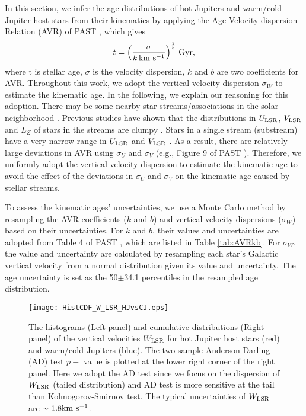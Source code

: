 \documentclass[twocolumn]{pnas-new}
\begin{document}
In this section, we infer the age distributions of hot Jupiters and warm/cold Jupiter host stars from their kinematics by applying the Age-Velocity dispersion Relation (AVR) of PAST \uppercase\expandafter{}, which gives
\begin{equation}
t = \left(\frac{\sigma}{k\rm \, km \ s^{-1}}\right)^{\frac{1}{b}}\, \rm Gyr,
\label{kineage}
\end{equation}
where t is stellar age, $\sigma$ is the velocity dispersion, $k$ and $b$ are two coefficients for AVR.
Throughout this work, we adopt the vertical velocity dispersion $\sigma_W$ to estimate the kinematic age. In the following, we explain our reasoning for this adoption. There may be some nearby star streams/associations in the solar neighborhood \citep[e.g.,][]{2016AstL...42...90B,2017A&A...608A..73K}.
Previous studies have shown that the distributions in $U_{\rm LSR}$, $V_{\rm LSR}$ and $L_Z$ of stars in the streams are clumpy \citep{2005A&A...430..165F,2012MNRAS.426L...1A,2017A&A...608A..73K,2018A&A...619A..72R}. Stars in a single stream (substream) have a very narrow range in $U_{\rm LSR}$ and $V_{\rm LSR}$ \citep[e.g.,][]{2019A&A...631A..47K}. As a result, there are relatively large deviations in AVR using $\sigma_U$ and $\sigma_V$ (e.g., Figure 9 of PAST \uppercase\expandafter{}).
Therefore, we uniformly adopt the vertical velocity dispersion to estimate the kinematic age to avoid the effect of the deviations in $\sigma_U$ and $\sigma_V$ on the kinematic age caused by stellar streams.

To assess the kinematic ages' uncertainties, we use a Monte Carlo method by resampling the AVR coefficients ($k$ and $b$) and vertical velocity dispersions ($\sigma_W$) based on their uncertainties.
For $k$ and $b$, their values and uncertainties are adopted from Table 4 of PAST \uppercase\expandafter{} \citep{2021ApJ...909..115C}, which are listed in Table \ref{tab:AVRkb}.
For $\sigma_W$, the value and uncertainty are calculated by resampling each star's Galactic vertical velocity from a normal distribution given its value and uncertainty.
The age uncertainty is set as the 50$\pm$34.1 percentiles in the resampled age distribution.

\begin{figure}[!t]
\centering
\texttt{[image: HistCDF\_W\_LSR\_HJvsCJ.eps]}
\caption{The histograms (Left panel) and cumulative distributions (Right panel) of the vertical velocities $W_{\rm LSR}$ for hot Jupiter host stars (red) and warm/cold Jupiters (blue).
The two-sample Anderson-Darling (AD)  test $p-$ value is plotted at the lower right corner of the right panel.
Here we adopt the AD test since we focus on the dispersion of $W_{\rm LSR}$ (tailed distribution) and AD test is more sensitive at the tail than Kolmogorov-Smirnov test.
{The typical uncertainties of $W_{\rm LSR}$ are $\sim 1.8 \rm km \ s^{-1}$.}
\label{figWLSRHJCJ}}
\end{figure}
\end{document}
